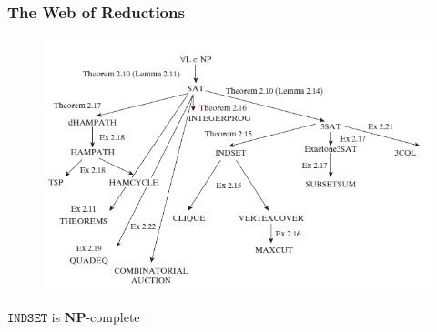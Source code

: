 \documentclass[11pt]{article}
\def \NP {\textbf{NP}}
\def \NP {\textbf{NP}}
\def \INDSET {\texttt{INDSET}}
\begin{document}
\subsubsection{The Web of Reductions}
\label{sec:org98d0336}
\begin{figure}[htbp]
\centering
\includegraphics[width=.9\linewidth]{../images/ComputationalComplexity/6.png}
\end{figure}

\begin{theorem}[]
\(\INDSET\) is \(\NP\)-complete
\end{theorem}
\end{document}
